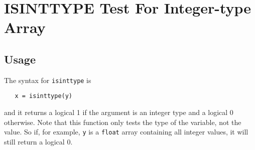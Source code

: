 \section{ISINTTYPE Test For Integer-type Array}

\subsection{Usage}

The syntax for \verb|isinttype| is 
\begin{verbatim}
   x = isinttype(y)
\end{verbatim}
and it returns a logical 1 if the argument is an integer type
and a logical 0 otherwise.  Note that this function only tests
the type of the variable, not the value.  So if, for example,
\verb|y| is a \verb|float| array containing all integer values, it will
still return a logical 0.
